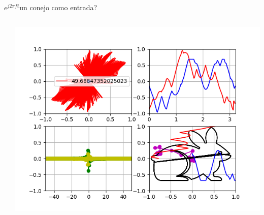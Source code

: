 \begin{frame}{$e^{j2\pi ft}$}{un conejo como entrada?}
   \handsonicon
   \begin{columns}[c]
      \hspace{2pt}
      \begin{column}{.5\textwidth}
         
      \end{column}
      \hspace{2pt}
      \vrule
      \hspace{2pt}
      \begin{column}{.4\textwidth}
         \centering\includegraphics[width=1.0\textwidth]{3_clase/euler8}
      \end{column}
      \hspace{2pt}
   \end{columns}
   \vfill
\end{frame}
